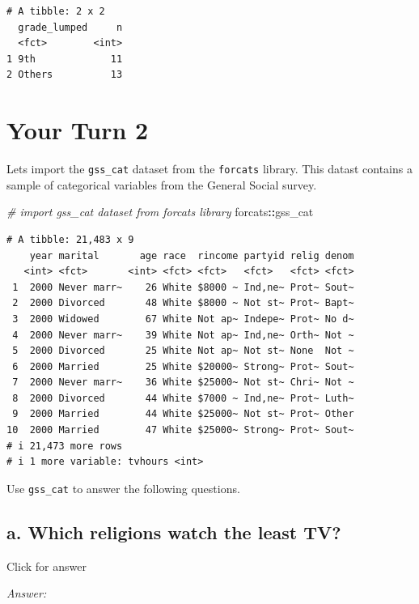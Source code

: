 \documentclass[
]{book}
\newenvironment{Shaded}{\begin{snugshade}}{\end{snugshade}}
\newcommand{\CommentTok}[1]{\textcolor[rgb]{0.56,0.35,0.01}{\textit{#1}}}
\newcommand{\NormalTok}[1]{#1}
\newcommand{\SpecialCharTok}[1]{\textcolor[rgb]{0.81,0.36,0.00}{\textbf{#1}}}
\begin{document}
\begin{verbatim}
# A tibble: 2 x 2
  grade_lumped     n
  <fct>        <int>
1 9th             11
2 Others          13
\end{verbatim}

\hypertarget{your-turn-2-2}{%
\section{Your Turn 2}\label{your-turn-2-2}}

Lets import the \texttt{gss\_cat} dataset from the \texttt{forcats} library. This datast contains a sample of categorical variables from the General Social survey.

\begin{Shaded}
\begin{Highlighting}[]
\CommentTok{\# import gss\_cat dataset from forcats library}
\NormalTok{forcats}\SpecialCharTok{::}\NormalTok{gss\_cat}
\end{Highlighting}
\end{Shaded}

\begin{verbatim}
# A tibble: 21,483 x 9
    year marital       age race  rincome partyid relig denom
   <int> <fct>       <int> <fct> <fct>   <fct>   <fct> <fct>
 1  2000 Never marr~    26 White $8000 ~ Ind,ne~ Prot~ Sout~
 2  2000 Divorced       48 White $8000 ~ Not st~ Prot~ Bapt~
 3  2000 Widowed        67 White Not ap~ Indepe~ Prot~ No d~
 4  2000 Never marr~    39 White Not ap~ Ind,ne~ Orth~ Not ~
 5  2000 Divorced       25 White Not ap~ Not st~ None  Not ~
 6  2000 Married        25 White $20000~ Strong~ Prot~ Sout~
 7  2000 Never marr~    36 White $25000~ Not st~ Chri~ Not ~
 8  2000 Divorced       44 White $7000 ~ Ind,ne~ Prot~ Luth~
 9  2000 Married        44 White $25000~ Not st~ Prot~ Other
10  2000 Married        47 White $25000~ Strong~ Prot~ Sout~
# i 21,473 more rows
# i 1 more variable: tvhours <int>
\end{verbatim}

Use \texttt{gss\_cat} to answer the following questions.

\hypertarget{a.-which-religions-watch-the-least-tv}{%
\subsection{a. Which religions watch the least TV?}\label{a.-which-religions-watch-the-least-tv}}

Click for answer

\emph{Answer:}
\end{document}
